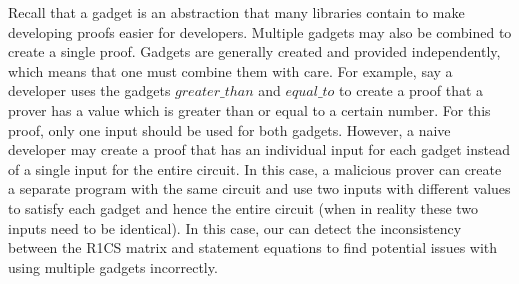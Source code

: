 Recall that a gadget is an abstraction that many \zksnark libraries contain to make developing proofs easier for developers.
Multiple gadgets may also be combined to create a single proof.  Gadgets are generally created and provided independently, which means that one must combine them with care. For example, say a developer uses the gadgets $greater\_than$ and $equal\_to$ to create a proof that a prover has a value which is greater than or equal to a certain number.  For this proof, only one input should be used for both gadgets.  However, a naive developer may create a proof that has an individual input for each gadget instead of a single input for the entire circuit.  In this case, a malicious prover can create a separate program with the same circuit and use two inputs with different values to satisfy each gadget and hence the entire circuit (when in reality these two inputs need to be identical). In this case, our \ConstraintChecker can detect the inconsistency between the R1CS matrix and statement equations to find potential issues with using multiple gadgets incorrectly. 


